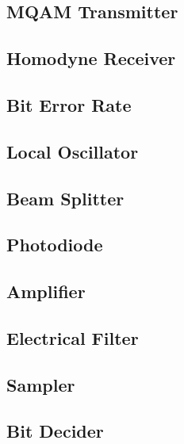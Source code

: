 \documentclass[a4paper]{article}
\begin{document}
\subsection{MQAM Transmitter}

\subsection{Homodyne Receiver}



\subsection{Bit Error Rate}


\subsection{Local Oscillator}


\subsection{Beam Splitter}


\subsection{Photodiode}


\subsection{Amplifier}


\subsection{Electrical Filter}


\subsection{Sampler}


\subsection{Bit Decider}

\end{document}
